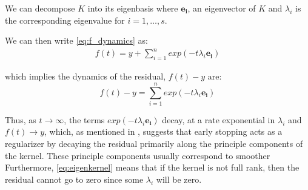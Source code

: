 We can decompose $K$ into its eigenbasis where $\mathbf{e_i}$, an eigenvector of $K$ and $\lambda_i$ is the corresponding eigenvalue for $i = 1, \ldots, s$. 

We can then write \eqref{eq:f_dynamics} as:
\begin{align}
    f(t) = y + \sum_{i=1}^n exp(-t \lambda_i \mathbf{e_i})
\end{align}

which implies the dynamics of the residual, $f(t) - y$ are:
\begin{equation}\label{eq:eigenkernel}
    f(t) - y = \sum_{i=1}^n exp(-t \lambda_i \mathbf{e_i})
\end{equation}

Thus, as $t \rightarrow \infty$, the terms $exp(-t \lambda_i\mathbf{e_i})$ decay, at a rate exponential in $\lambda_i$ and $f(t) \rightarrow y$, which, as mentioned in \cite{NTKJacot}, suggests that early stopping acts as a regularizer by decaying the residual primarily along the principle components of the kernel. These principle components usually correspond to smoother  Furthermore, \eqref{eq:eigenkernel} means that if the kernel is not full rank, then the residual cannot go to zero since some $\lambda_i$ will be zero.